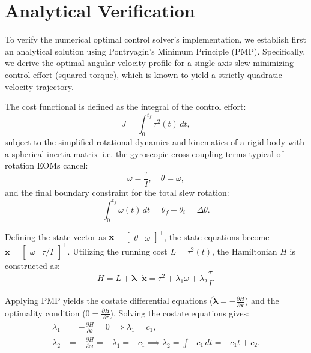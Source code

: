 \section{Analytical Verification}
\label{sec:analytical_verification}

To verify the numerical optimal control solver's implementation, we establish first an analytical solution using Pontryagin's Minimum Principle (PMP). 
Specifically, we derive the optimal angular velocity profile for a single-axis slew minimizing control effort (squared torque), which is known to yield a strictly quadratic velocity trajectory. 

The cost functional is defined as the integral of the control effort:
\begin{equation}
    J = \int_{0}^{t_f} \tau^2(t) \, dt,
\end{equation}
subject to the simplified rotational dynamics and kinematics of a rigid body with a spherical inertia matrix--i.e. the gyroscopic cross coupling terms typical of rotation \ac{EOM}s cancel:
\begin{equation}
    \dot{\omega} = \frac{\tau}{I}, \quad \dot{\theta} = \omega,
\end{equation}
and the final boundary constraint for the total slew rotation:
\begin{equation}
    \int_{0}^{t_f} \omega(t) \, dt = \theta_f - \theta_i = \Delta \theta.
\end{equation}

Defining the state vector as $\mathbf{x} = \begin{bmatrix} \theta & \omega \end{bmatrix}^\top$, the state equations become $\dot{\mathbf{x}} = \begin{bmatrix} \omega & \tau/I \end{bmatrix}^\top$. Utilizing the running cost $L = \tau^2(t)$, the Hamiltonian $H$ is constructed as:
\begin{equation}
    H = L + \boldsymbol{\lambda}^\top \dot{\mathbf{x}} = \tau^2 + \lambda_1 \omega + \lambda_2 \frac{\tau}{I}.
\end{equation}

Applying PMP yields the costate differential equations ($\dot{\boldsymbol{\lambda}} = -\frac{\partial H}{\partial \mathbf{x}}$) and the optimality condition ($0 = \frac{\partial H}{\partial \tau}$). Solving the costate equations gives:
\begin{align}
    \dot{\lambda}_1 &= -\frac{\partial H}{\partial \theta} = 0 \implies \lambda_1 = c_1, \\
    \dot{\lambda}_2 &= -\frac{\partial H}{\partial \omega} = -\lambda_1 = -c_1 \implies \lambda_2 = \int -c_1 \, dt = -c_1 t + c_2.
\end{align}

